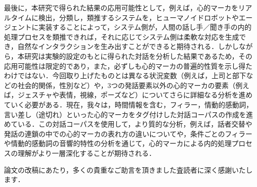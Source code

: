 \documentclass[japanese]{jnlp_1.3a}
\begin{document}
最後に，本研究で得られた結果の応用可能性として，例えば，心的マーカをリアルタイムに検出，分類し，類推するシステムを，ヒューマノイドロボットやエージェントに実装することによって，システム側が，人間の話し手／聞き手の内的処理プロセスを類推できれば，それに応じてシステム側は柔軟な対応を生成でき，自然なインタラクションを生み出すことができると期待される．しかしながら，本研究は実験的設定のもとに得られた対話を分析した結果であるため，その応用可能性は限定的であり，また，必ずしも心的マーカの普遍的性質を示し得たわけではない．今回取り上げたものとは異なる状況変数（例えば，上司と部下などの社会的関係，性別など）や，3つの発話要素以外の心的マーカの要素（例えば，ジェスチャや表情，視線，ポーズなど）についてさらに詳細なる分析を進めていく必要がある．現在，我々は，時間情報を含む，フィラー，情動的感動詞，言い差し（途切れ）といった心的マーカをタグ付けした対話コーパスの作成を進めている．この対話コーパスを使用して，より質的な分析，例えば，話者交替や発話の連鎖の中での心的マーカの表れ方の違いについてや，条件ごとのフィラーや情動的感動詞の音響的特性の分析を通じて，心的マーカによる内的処理プロセスの理解がより一層深化することが期待される．


\acknowledgment

論文の改稿にあたり，多くの貴重なご助言を頂きました査読者に深く感謝いたします．
\end{document}
